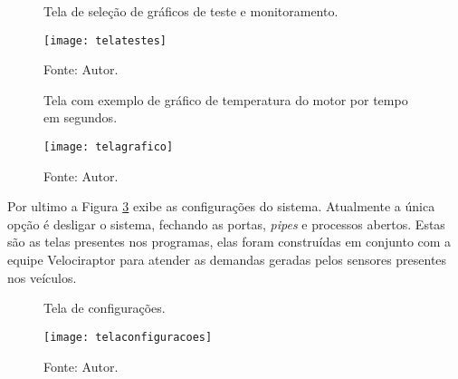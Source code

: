 \begin{figure}[!htb]
	\centering
		\caption{Tela de seleção de gráficos de teste e monitoramento.}
		\texttt{[image: telatestes]} 
		\caption*{Fonte: Autor.}
		\label{fig:telatestes}
\end{figure}    

\begin{figure}[!htb]
	\centering
		\caption{Tela com exemplo de gráfico de temperatura do motor por tempo em segundos.}
		\texttt{[image: telagrafico]} 
		\caption*{Fonte: Autor.}
		\label{fig:telagrafico}
\end{figure}    

Por ultimo a Figura \ref{fig:telaconfiguracao} exibe as configurações do sistema. Atualmente a única opção é desligar o sistema, fechando as portas, \textit{pipes} e processos abertos. Estas são as telas presentes nos programas, elas foram construídas em conjunto com a equipe Velociraptor para atender as demandas geradas pelos sensores presentes nos veículos.


\begin{figure}[!htb]
	\centering
		\caption{Tela de configurações.}
		\texttt{[image: telaconfiguracoes]} 
		\caption*{Fonte: Autor.}
		\label{fig:telaconfiguracao}
\end{figure}    

